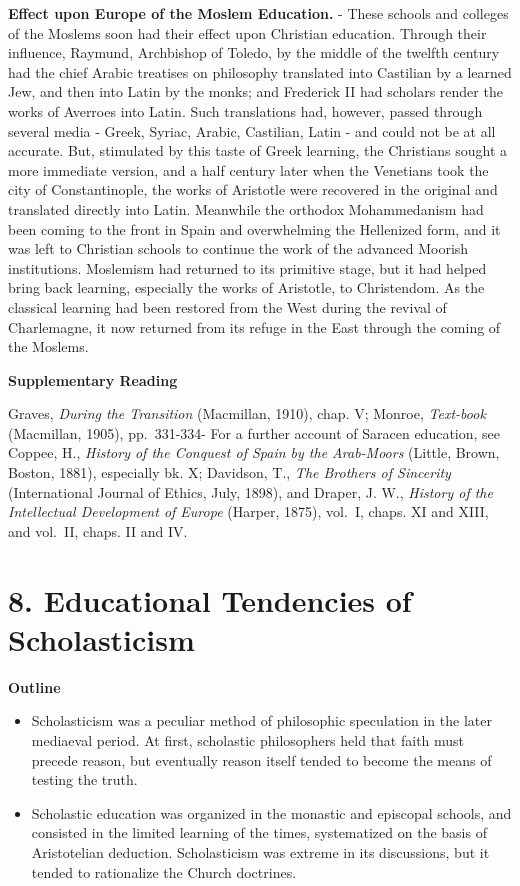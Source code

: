\documentclass[]{book}
\providecommand{\tightlist}{%
  \setlength{\itemsep}{0pt}\setlength{\parskip}{0pt}}
\begin{document}
\textbf{Effect upon Europe of the Moslem Education.} - These schools and colleges of the Moslems soon had their effect upon Christian education. Through their influence, Raymund, Archbishop of Toledo, by the middle of the twelfth century had the chief Arabic treatises on philosophy translated into Castilian by a learned Jew, and then into Latin by the monks; and Frederick II had scholars render the works of Averroes into Latin. Such translations had, however, passed through several media - Greek, Syriac, Arabic, Castilian, Latin - and could not be at all accurate. But, stimulated by this taste of Greek learning, the Christians sought a more immediate version, and a half century later when the Venetians took the city of Constantinople, the works of Aristotle were recovered in the original and translated directly into Latin. Meanwhile the orthodox Mohammedanism had been coming to the front in Spain and overwhelming the Hellenized form, and it was left to Christian schools to continue the work of the advanced Moorish institutions. Moslemism had returned to its primitive stage, but it had helped bring back learning, especially the works of Aristotle, to Christendom. As the classical learning had been restored from the West during the revival of Charlemagne, it now returned from its refuge in the East through the coming of the Moslems.

\textbf{Supplementary Reading}

Graves, \emph{During the Transition} (Macmillan, 1910), chap. V; Monroe, \emph{Text-book} (Macmillan, 1905), pp.~331-334- For a further account of Saracen education, see Coppee, H., \emph{History of the Conquest of Spain by the Arab-Moors} (Little, Brown, Boston, 1881), especially bk. X; Davidson, T., \emph{The Brothers of Sincerity} (International Journal of Ethics, July, 1898), and Draper, J. W., \emph{History of the Intellectual Development of Europe} (Harper, 1875), vol.~I, chaps. XI and XIII, and vol.~II, chaps. II and IV.

\hypertarget{educational-tendencies-of-scholasticism}{%
\chapter{8. Educational Tendencies of Scholasticism}\label{educational-tendencies-of-scholasticism}}

\textbf{Outline}

\begin{itemize}
\tightlist
\item
  Scholasticism was a peculiar method of philosophic speculation in the later mediaeval period. At first, scholastic philosophers held that faith must precede reason, but eventually reason itself tended to become the means of testing the truth.
\item
  Scholastic education was organized in the monastic and episcopal schools, and consisted in the limited learning of the times, systematized on the basis of Aristotelian deduction. Scholasticism was extreme in its discussions, but it tended to rationalize the Church doctrines.
\end{itemize}
\end{document}
